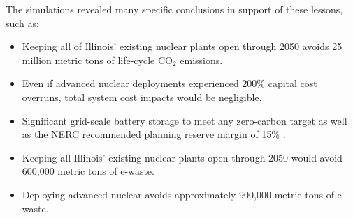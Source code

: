 The simulations revealed many specific conclusions in support of these lessons, 
such as:
\begin{itemize}
        \item Keeping all of Illinois' existing nuclear plants open through 
                2050 avoids 25 million metric tons of life-cycle CO$_2$ emissions. 
        \item Even if advanced nuclear deployments experienced 200\% capital 
                cost overruns, total system cost impacts would be negligible.
        \item Significant grid-scale battery storage to meet any zero-carbon 
                target as well as the \gls{NERC} 
                recommended planning reserve margin of 15\% 
                \cite{reimers_impact_2019}.
        \item Keeping all Illinois' existing nuclear plants open through 2050 
                would avoid 600,000 metric tons of e-waste.
        \item Deploying advanced nuclear avoids approximately 900,000 metric 
                tons of e-waste. 
\end{itemize}





